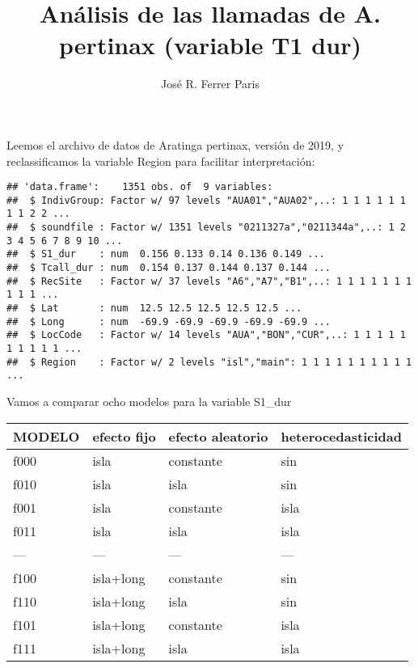 \documentclass[]{article}
\title{Análisis de las llamadas de A. pertinax (variable T1 dur)}
\author{José R. Ferrer Paris}
\date{}
\newenvironment{Shaded}{\begin{snugshade}}{\end{snugshade}}
\newcommand{\DataTypeTok}[1]{\textcolor[rgb]{0.13,0.29,0.53}{#1}}
\newcommand{\KeywordTok}[1]{\textcolor[rgb]{0.13,0.29,0.53}{\textbf{#1}}}
\newcommand{\NormalTok}[1]{#1}
\newcommand{\OperatorTok}[1]{\textcolor[rgb]{0.81,0.36,0.00}{\textbf{#1}}}
\newcommand{\StringTok}[1]{\textcolor[rgb]{0.31,0.60,0.02}{#1}}
\begin{document}
\maketitle

Leemos el archivo de datos de Aratinga pertinax, versión de 2019, y
reclassificamos la variable Region para facilitar interpretación:

\begin{Shaded}
\end{Shaded}

\begin{verbatim}
## 'data.frame':    1351 obs. of  9 variables:
##  $ IndivGroup: Factor w/ 97 levels "AUA01","AUA02",..: 1 1 1 1 1 1 1 1 2 2 ...
##  $ soundfile : Factor w/ 1351 levels "0211327a","0211344a",..: 1 2 3 4 5 6 7 8 9 10 ...
##  $ S1_dur    : num  0.156 0.133 0.14 0.136 0.149 ...
##  $ Tcall_dur : num  0.154 0.137 0.144 0.137 0.144 ...
##  $ RecSite   : Factor w/ 37 levels "A6","A7","B1",..: 1 1 1 1 1 1 1 1 1 1 ...
##  $ Lat       : num  12.5 12.5 12.5 12.5 12.5 ...
##  $ Long      : num  -69.9 -69.9 -69.9 -69.9 -69.9 ...
##  $ LocCode   : Factor w/ 14 levels "AUA","BON","CUR",..: 1 1 1 1 1 1 1 1 1 1 ...
##  $ Region    : Factor w/ 2 levels "isl","main": 1 1 1 1 1 1 1 1 1 1 ...
\end{verbatim}

\begin{Shaded}
\end{Shaded}

Vamos a comparar ocho modelos para la variable S1\_dur

\begin{longtable}[]{@{}llll@{}}
\toprule
MODELO & efecto fijo & efecto aleatorio &
heterocedasticidad\tabularnewline
\midrule
\endhead
f000 & isla & constante & sin\tabularnewline
f010 & isla & isla & sin\tabularnewline
f001 & isla & constante & isla\tabularnewline
f011 & isla & isla & isla\tabularnewline
--- & --- & --- & ---\tabularnewline
f100 & isla+long & constante & sin\tabularnewline
f110 & isla+long & isla & sin\tabularnewline
f101 & isla+long & constante & isla\tabularnewline
f111 & isla+long & isla & isla\tabularnewline
\bottomrule
\end{longtable}
\end{document}
